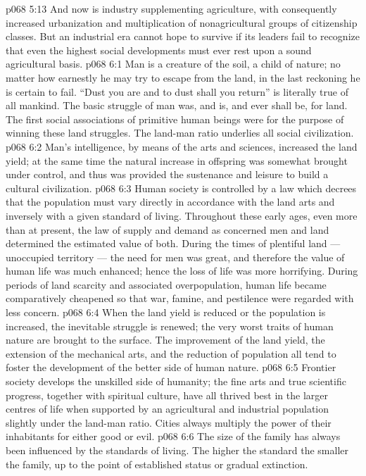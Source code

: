 \vs p068 5:13 And now is industry supplementing agriculture, with consequently increased urbanization and multiplication of nonagricultural groups of citizenship classes. But an industrial era cannot hope to survive if its leaders fail to recognize that even the highest social developments must ever rest upon a sound agricultural basis.
\vs p068 6:1 Man is a creature of the soil, a child of nature; no matter how earnestly he may try to escape from the land, in the last reckoning he is certain to fail. “Dust you are and to dust shall you return” is literally true of all mankind. The basic struggle of man was, and is, and ever shall be, for land. The first social associations of primitive human beings were for the purpose of winning these land struggles. The land\hyp{}man ratio underlies all social civilization.
\vs p068 6:2 Man’s intelligence, by means of the arts and sciences, increased the land yield; at the same time the natural increase in offspring was somewhat brought under control, and thus was provided the sustenance and leisure to build a cultural civilization.
\vs p068 6:3 \pc Human society is controlled by a law which decrees that the population must vary directly in accordance with the land arts and inversely with a given standard of living. Throughout these early ages, even more than at present, the law of supply and demand as concerned men and land determined the estimated value of both. During the times of plentiful land --- unoccupied territory --- the need for men was great, and therefore the value of human life was much enhanced; hence the loss of life was more horrifying. During periods of land scarcity and associated overpopulation, human life became comparatively cheapened so that war, famine, and pestilence were regarded with less concern.
\vs p068 6:4 When the land yield is reduced or the population is increased, the inevitable struggle is renewed; the very worst traits of human nature are brought to the surface. The improvement of the land yield, the extension of the mechanical arts, and the reduction of population all tend to foster the development of the better side of human nature.
\vs p068 6:5 \pc Frontier society develops the unskilled side of humanity; the fine arts and true scientific progress, together with spiritual culture, have all thrived best in the larger centres of life when supported by an agricultural and industrial population slightly under the land\hyp{}man ratio. Cities always multiply the power of their inhabitants for either good or evil.
\vs p068 6:6 The size of the family has always been influenced by the standards of living. The higher the standard the smaller the family, up to the point of established status or gradual extinction.
